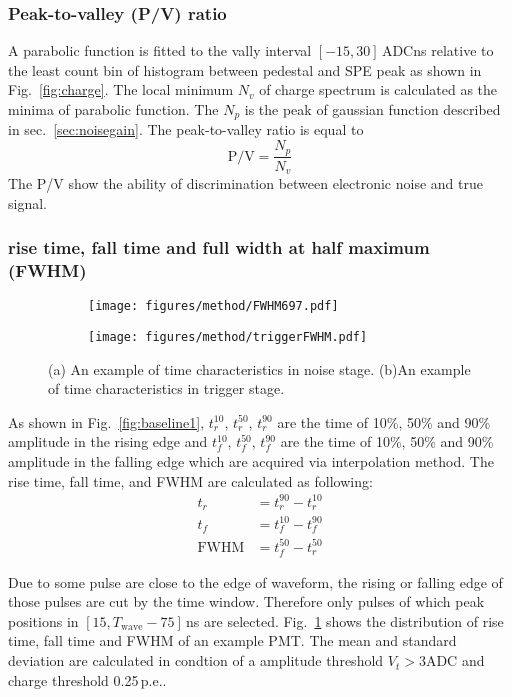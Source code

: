 \subsubsection{Peak-to-valley (P/V) ratio}
A parabolic function is fitted to the vally interval $[-15, 30]$\,ADCns relative to the least count bin of histogram between pedestal and SPE peak as shown in Fig.~\ref{fig:charge}. The local minimum $N_v$ of charge spectrum is calculated as the minima of parabolic function. The $N_p$ is the peak of gaussian function described in sec.~\ref{sec:noisegain}. The peak-to-valley ratio is equal to  
\begin{equation}
    \mathrm{P/V}=\frac{N_p}{N_v}
\end{equation}
The P/V show the ability of discrimination between electronic noise and true signal.
\subsubsection{rise time, fall time and full width at half maximum (FWHM)}
\begin{figure}[!htbp]
    \centering
    \begin{subfigure}[t]{0.49\textwidth}
        \texttt{[image: figures/method/FWHM697.pdf]}
        \caption{}
        \label{fig:risefallFWHM}
    \end{subfigure}
    \begin{subfigure}[t]{0.49\textwidth}
        \texttt{[image: figures/method/triggerFWHM.pdf]}
        \caption{}
        \label{fig:triggerFWHM}
    \end{subfigure}
    \caption{(a) An example of time characteristics in noise stage. (b)An example of time characteristics in trigger stage.}
\end{figure}
As shown in Fig.~\ref{fig:baseline1}, $t^{10}_r$, $t^{50}_r$, $t^{90}_r$ are the time of 10\%, 50\% and 90\% amplitude in the rising edge and $t^{10}_f$, $t^{50}_f$, $t^{90}_f$ are the time of 10\%, 50\% and 90\% amplitude in the falling edge which are acquired via interpolation method. The rise time, fall time, and FWHM are calculated as following:
\begin{align}
    t_r &= t^{90}_r - t^{10}_r\\
    t_f &= t^{10}_f - t^{90}_f\\
    \mathrm{FWHM} &= t^{50}_f - t^{50}_r
\end{align}

Due to some pulse are close to the edge of waveform, the rising or falling edge of those pulses are cut by the time window. Therefore only pulses of which peak positions in $[15, T_{\mathrm{wave}}-75]$\,ns are selected. Fig.~\ref{fig:risefallFWHM} shows the distribution of rise time, fall time and FWHM of an example PMT. The mean and standard deviation are calculated in condtion of a amplitude threshold $V_{t}>3\mathrm{ADC}$ and charge threshold 0.25\,p.e..

